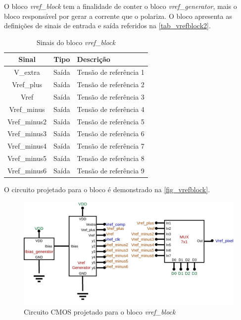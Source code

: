 \renewcommand{\NomeBloco}{\emph{vref\_block}}
\newcommand{\NomeBlocoA}{vrefblock}
\renewcommand{\NomePTab}{tab_\NomeBlocoA}
\renewcommand{\NomeSTab}{tab_\NomeBlocoA2}
\renewcommand{\NomePFig}{fig_\NomeBlocoA}
\renewcommand{\NomeSFig}{fig_\NomeBlocoA2}
\renewcommand{\NomeTTab}{tab_\NomeBlocoA3}

O bloco \NomeBloco{} tem a finalidade de conter o bloco \emph{vref\_generator}, mais o bloco respons\'avel por gerar a corrente que o polariza. O bloco apresenta as defini{\c c}\~oes de sinais de entrada e sa\'ida referidos na \autoref{\NomeSTab}.

\begin{table}[htbp]
\caption{Sinais do bloco \NomeBloco}
\label{\NomeSTab}
\centering
\begin{tabular}{ccl}

    \toprule
    Sinal & Tipo    & Descri{\c c}\~ao      \\
    \midrule \midrule
    V\_extra   & Saída   & Tens\~ao de refer\^encia 1 \\
    \midrule
    Vref\_plus   & Saída   & Tens\~ao de refer\^encia 2 \\
    \midrule
    Vref   & Saída   & Tens\~ao de refer\^encia 3 \\
    \midrule
    Vref\_minus   & Saída   & Tens\~ao de refer\^encia 4 \\
    \midrule
    Vref\_minus2   & Saída   & Tens\~ao de refer\^encia 5 \\
    \midrule
    Vref\_minus3   & Saída   & Tens\~ao de refer\^encia 6 \\
    \midrule
    Vref\_minus4  & Saída   & Tens\~ao de refer\^encia 7 \\
    \midrule
    Vref\_minus5   & Saída   & Tens\~ao de refer\^encia 8 \\
    \midrule
    Vref\_minus6   & Saída   & Tens\~ao de refer\^encia 9 \\
    \bottomrule
\end{tabular}
\end{table}

O circuito projetado para o bloco \'e demonstrado na \autoref{\NomePFig}.

\begin{figure}[htb]
 \label{NomePFig}
 \centering
    \centering
    \caption{Circuito CMOS projetado para o bloco \NomeBloco} \label{\NomePFig}
    \includegraphics[scale=0.3]{Circuitos/vref_block.png}
\end{figure}

